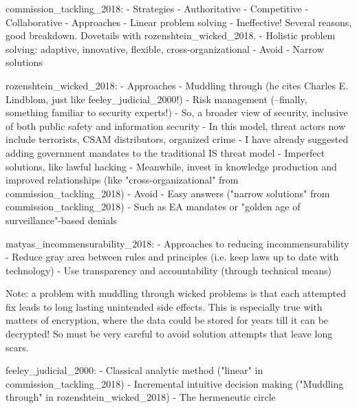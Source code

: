 commission_tackling_2018:
- Strategies
  - Authoritative
  - Competitive
  - Collaborative
- Approaches
  - Linear problem solving
    - Ineffective! Several reasons, good breakdown. Dovetails with rozenshtein_wicked_2018.
  - Holistic problem solving: adaptive, innovative, flexible, cross-organizational
- Avoid
  - Narrow solutions

rozenshtein_wicked_2018:
- Approaches
  - Muddling through (he cites Charles E. Lindblom, just like feeley_judicial_2000!)
  - Risk management (--finally, something familiar to security experts!)
    - So, a broader view of security, inclusive of both public safety and information security
    - In this model, threat actors now include terrorists, CSAM distributors, organized crime
    - I have already suggested adding government mandates to the traditional IS threat model
  - Imperfect solutions, like lawful hacking
  - Meanwhile, invest in knowledge production and improved relationships (like "cross-organizational" from
      commission_tackling_2018)
- Avoid
  - Easy answers ("narrow solutions" from commission_tackling_2018)
    - Such as EA mandates or "golden age of surveillance"-based denials

matyas_incommensurability_2018:
- Approaches to reducing incommensurability
  - Reduce gray area between rules and principles (i.e. keep laws up to date with technology)
  - Use transparency and accountability (through technical means)

Note: a problem with muddling through wicked problems is that each attempted fix leads to long lasting unintended side
effects. This is especially true with matters of encryption, where the data could be stored for years till it can be
decrypted! So must be very careful to avoid solution attempts that leave long scars.

feeley_judicial_2000:
- Classical analytic method ("linear" in commission_tackling_2018)
- Incremental intuitive decision making ("Muddling through" in rozenshtein_wicked_2018)
- The hermeneutic circle



